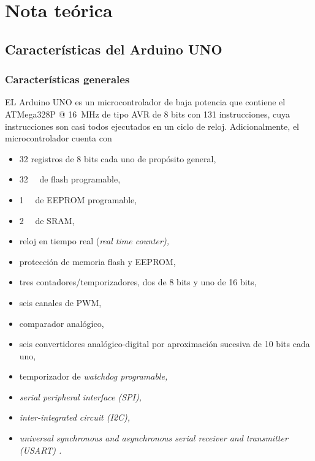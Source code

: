 \section{Nota teórica}
\subsection{Características del Arduino UNO}
\subsubsection{Características generales}
EL Arduino UNO es un microcontrolador de baja potencia que contiene el ATMega328P @ \SI{16}{\mega\hertz} de tipo AVR de 8 bits con 131 instrucciones, cuya instrucciones son casi todos ejecutados en un ciclo de reloj. Adicionalmente, el microcontrolador cuenta con
\begin{itemize}
    \item 32 registros de 8 bits cada uno de propósito general,
    \item \SI{32}{\kilo\byte} de flash programable,
    \item \SI{1}{\kilo\byte} de EEPROM programable,
    \item \SI{2}{\kilo\byte} de SRAM,
    \item reloj en tiempo real (\it{real time counter}), 
    \item protección de memoria flash y EEPROM,
    \item tres contadores/temporizadores, dos de 8 bits y uno de 16 bits,
    \item seis canales de PWM,
    \item comparador analógico,
    \item seis convertidores analógico-digital por aproximación sucesiva de 10 bits cada uno,
    \item temporizador de \it{watchdog} programable,
    \item \it{serial peripheral interface} (SPI),
    \item \it{inter-integrated circuit} (I2C),
    \item \it{universal synchronous and asynchronous serial receiver and transmitter} (USART) \cite{datasheet, atmega}.
\end{itemize}
